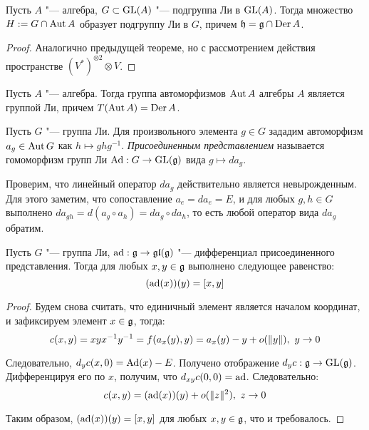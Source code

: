 \begin{corollary}
	Пусть $A$ "--- алгебра, $G \subset \operatorname{GL}(A)$ "--- подгруппа Ли в $\operatorname{GL}(A)$. Тогда множество $H := G \cap \operatorname{Aut}{A}$ образует подгруппу Ли в $G$, причем $\mathfrak h = \mathfrak g \cap \operatorname{Der}{A}$.
\end{corollary}

\begin{proof}
	Аналогично предыдущей теореме, но с рассмотрением действия пространстве $(V^*)^{\otimes 2} \otimes V$.
\end{proof}

\begin{corollary}
	Пусть $A$ "--- алгебра. Тогда группа автоморфизмов $\operatorname{Aut}{A}$ алгебры $A$ является группой Ли, причем $T(\operatorname{Aut}{A}) = \operatorname{Der}{A}$.
\end{corollary}

\begin{definition}
	Пусть $G$ "--- группа Ли. Для произвольного элемента $g \in G$ зададим автоморфизм $a_g \in \operatorname{Aut}{G}$ как $h \mapsto ghg^{-1}$. \textit{Присоединенным представлением} называется гомоморфизм групп Ли $\operatorname{Ad}: G \to \operatorname{GL}(\mathfrak g)$ вида $g \mapsto da_g$.
\end{definition}

\begin{note}
	Проверим, что линейный оператор $da_g$ действительно является невырожденным. Для этого заметим, что сопоставление $a_e = da_e = E$, и для любых $g, h \in G$ выполнено $da_{gh} = d(a_g \circ a_h) = da_g \circ da_h$, то есть любой оператор вида $da_g$ обратим.
\end{note}

\begin{theorem}
	Пусть $G$ "--- группа Ли, $\operatorname{ad}: \mathfrak g \to \mathfrak{gl}(\mathfrak g)$ "--- дифференциал присоединенного представления. Тогда для любых $x, y \in \mathfrak{g}$ выполнено следующее равенство:
	\[(\operatorname{ad} (x))(y) = [x, y]\]
\end{theorem}

\begin{proof}
	Будем снова считать, что единичный элемент является началом координат, и зафиксируем элемент $x \in \mathfrak{g}$, тогда:
	\[c(x, y) = xyx^{-1}y^{-1} = f{(a_x(y), y)} = a_x(y) - y + o(\|y\|),~y \to 0\]
	
	Следовательно, $d_yc(x, 0) = \operatorname{Ad}(x) - E$. Получено отображение $d_yc: \mathfrak g \to \operatorname{GL}(\mathfrak g)$. Дифференцируя его по $x$, получим, что $d_{xy}c(0, 0) = \operatorname{ad}$. Следовательно:
	\[c(x, y) = (\operatorname{ad} (x))(y) + o(\|z\|^2),~z \to 0\]
	
	Таким образом, $(\operatorname{ad} (x))(y) = [x, y]$ для любых $x, y \in \mathfrak g$, что и требовалось.
\end{proof}

